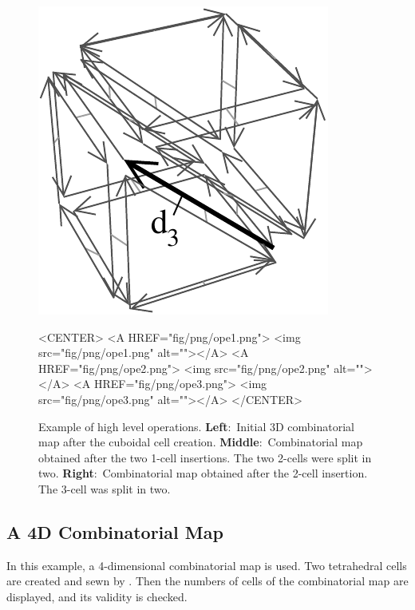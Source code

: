\begin{figure}
\begin{ccTexOnly}
\begin{center}
      \includegraphics[width=\largFig]{Combinatorial_map/fig/pdf/ope3}
    \end{center}
  \end{ccTexOnly}
  \begin{ccHtmlOnly}
    <CENTER>
    <A HREF="fig/png/ope1.png"> <img src="fig/png/ope1.png" alt=""></A>
    <A HREF="fig/png/ope2.png"> <img src="fig/png/ope2.png" alt=""></A>
    <A HREF="fig/png/ope3.png"> <img src="fig/png/ope3.png" alt=""></A>
    </CENTER>
    \end{ccHtmlOnly}  
      \caption{Example of high level operations.  
        \textbf{Left}:~Initial 3D combinatorial map after the cuboidal 
        cell creation. \textbf{Middle}:~Combinatorial map obtained after
        the two 1-cell insertions. The two 2-cells were split in two.
        \textbf{Right}:~Combinatorial map obtained after the 2-cell 
        insertion. The 3-cell was split in two.}
    \label{fig_exemple_ope}
\end{figure}


\subsection{A 4D Combinatorial Map}
In this example, a 4-dimensional combinatorial map is used.  Two
tetrahedral cells are created and sewn by \betaquatre{}.  Then the numbers
of cells of the combinatorial map are displayed, and its validity is
checked. 

